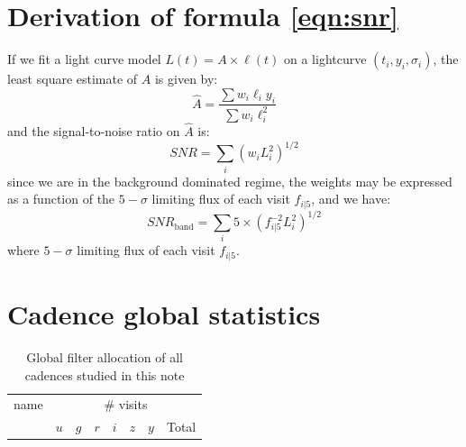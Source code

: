 \documentclass [11pt,a4paper]{article}
\begin{document}
\begin{appendices}

\section{Derivation of formula \ref{eqn:snr}}

\label{sec:snr}

If we fit a light curve model $L(t) = A \times \ell(t)$ on a
lightcurve $(t_i, y_i, \sigma_i)$, the least square estimate of $A$ is
given by:
$$
\hat{A} = \frac{\sum w_i \ell_i y_i}{\sum w_i \ell_i^2}
$$
and the signal-to-noise ratio on $\hat{A}$ is:
$$
SNR = \sum_i (w_i L_i^2)^{1/2}
$$ since we are in the background dominated regime, the weights may be
expressed as a function of the $5-\sigma$ limiting flux of each visit
$f_{i|5}$, and we have:
$$
SNR_{\mathrm{band}} = \sum_{i} 5 \times (f^{-2}_{i|5} L_i^2)^{1/2}
$$
where $5-\sigma$ limiting flux of each visit $f_{i|5}$.


\section{Cadence global statistics}

  \begin{longtable}{l|ccccccc}
    \caption{Global filter allocation of all cadences studied in this note\label{tab:global_cadence_stats}\label{tab:global_cadence_stats}}        \\
    \hline
    \hline    
  name & \multicolumn{7}{c}{\# visits} \\
       & $u$ & $g$ & $r$ & $i$ & $z$ & $y$ & Total \\


\end{longtable}
\end{appendices}
\end{document}
